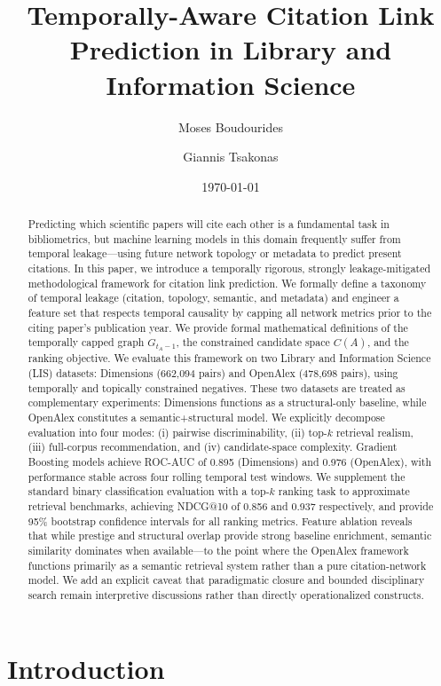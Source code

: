 \documentclass[11pt,a4paper]{article}
\title{Temporally-Aware Citation Link Prediction in Library and Information Science}
\author[1]{Moses Boudourides}
\author[2]{Giannis Tsakonas}
\affil[1]{Department of Mathematics, University of Patras, Greece}
\affil[2]{Library \& Information Center, University of Patras, Greece}
\date{\today}
\begin{document}
\maketitle

\begin{abstract}
Predicting which scientific papers will cite each other is a fundamental task in bibliometrics, but machine learning models in this domain frequently suffer from temporal leakage---using future network topology or metadata to predict present citations. In this paper, we introduce a temporally rigorous, strongly leakage-mitigated methodological framework for citation link prediction. We formally define a taxonomy of temporal leakage (citation, topology, semantic, and metadata) and engineer a feature set that respects temporal causality by capping all network metrics prior to the citing paper's publication year. We provide formal mathematical definitions of the temporally capped graph $G_{t_A-1}$, the constrained candidate space $C(A)$, and the ranking objective. We evaluate this framework on two Library and Information Science (LIS) datasets: Dimensions (662,094 pairs) and OpenAlex (478,698 pairs), using temporally and topically constrained negatives. These two datasets are treated as complementary experiments: Dimensions functions as a structural-only baseline, while OpenAlex constitutes a semantic+structural model. We explicitly decompose evaluation into four modes: (i) pairwise discriminability, (ii) top-$k$ retrieval realism, (iii) full-corpus recommendation, and (iv) candidate-space complexity. Gradient Boosting models achieve ROC-AUC of 0.895 (Dimensions) and 0.976 (OpenAlex), with performance stable across four rolling temporal test windows. We supplement the standard binary classification evaluation with a top-$k$ ranking task to approximate retrieval benchmarks, achieving NDCG@10 of 0.856 and 0.937 respectively, and provide 95\% bootstrap confidence intervals for all ranking metrics. Feature ablation reveals that while prestige and structural overlap provide strong baseline enrichment, semantic similarity dominates when available---to the point where the OpenAlex framework functions primarily as a semantic retrieval system rather than a pure citation-network model. We add an explicit caveat that paradigmatic closure and bounded disciplinary search remain interpretive discussions rather than directly operationalized constructs.
\end{abstract}

\section{Introduction}
\label{sec:intro}
\end{document}
